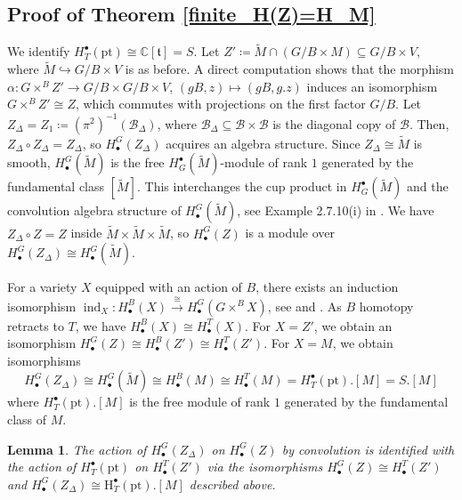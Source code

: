 \documentclass[11pt]{article}
\newcommand{\C}{\mathbb{C}}
\newcommand{\B}{\mathcal{B}}
\renewcommand{\t}{\mathfrak{t}}
\newcommand{\1}{\mathbb{1}}
\newcommand{\HBM}[2]{H_\bullet^{#1}(#2)}
\newcommand{\tM}{\widetilde{M}}
\newcommand{\pt}{\text{pt}}
\renewcommand{\subset}{\subseteq}
\newtheorem{lemma}[theorem]{Lemma}
\theoremstyle{definition}
\numberwithin{equation}{section}
\begin{document}
\subsection*{Proof of Theorem \ref{finite_H(Z)=H_M}}

We identify $H^\bullet_T(\pt) \cong \C[\t] = S$. Let $Z'\coloneqq \tM \cap (G/B\times M) \subset G/B \times V$, where $\tM \hookrightarrow G/B \times V$ is as before. A direct computation shows that the morphism $\alpha : G\times^B Z' \rightarrow G/B \times G/B \times V$, $(gB,z) \mapsto (gB, g.z)$ induces an isomorphism $G\times^B Z' \cong Z$, which commutes with projections on the first factor $G/B$. Let $Z_\Delta = Z_1 \coloneqq (\pi^2)^{-1}(\B_\Delta)$, where $\B_\Delta \subset \B \times \B$ is the diagonal copy of $\B$. Then, $Z_\Delta \circ Z_\Delta = Z_\Delta$, so $\HBM{G}{Z_\Delta}$ acquires an algebra structure. Since $Z_\Delta \cong \tM$ is smooth, $\HBM{G}{\tM}$ is the free $H^\bullet_{G}(\tM)$-module of rank $1$ generated by the fundamental class $[\tM]$. This interchanges the cup product in $H^\bullet_{G}(\tM)$ and the convolution algebra structure of $\HBM{G}{\tM}$, see Example 2.7.10(i) in \cite{CG}. We have $Z_\Delta \circ Z = Z$ inside $\tM \times \tM \times \tM$, so $\HBM{G}{Z}$ is a module over $\HBM{G}{Z_\Delta} \cong \HBM{G}{\tM}$. 

For a variety $X$ equipped with an action of $B$, there exists an induction isomorphism {$\operatorname{ind}_X :\HBM{B}{X} \xrightarrow{\cong} \HBM{G}{G\times^B X}$}, see \cite[]{BL} and \cite[.16]{CG}. As $B$ homotopy retracts to $T$, we have $\HBM{B}{X} \cong \HBM{T}{X}$. For $X=Z'$, we obtain an isomorphism $\HBM{G}{Z} \cong \HBM{B}{Z'} \cong \HBM{T}{Z'}$. For $X=M$, we obtain isomorphisms $$\HBM{G}{Z_\Delta} \cong \HBM{G}{\tM} \cong \HBM{B}{M} \cong \HBM{T}{M} = H^\bullet_T(\pt).[M] = S.[M]$$ where $H^\bullet_T(\pt).[M]$ is the free module of rank $1$ generated by the fundamental class of $M$.

\begin{lemma}
\label{finite_S_actions_agree}
    The action of $\HBM{G}{Z_\Delta}$ on $\HBM{G}{Z}$ by convolution is identified with the action of $H^\bullet_T(\pt)$ on $\HBM{T}{Z'}$ via the isomorphisms $\HBM{G}{Z} \cong \HBM{T}{Z'}$ and $\HBM{G}{Z_\Delta} \cong \text{H}^\bullet_T(\pt).[M]$ described above.
\end{lemma}
\end{document}
